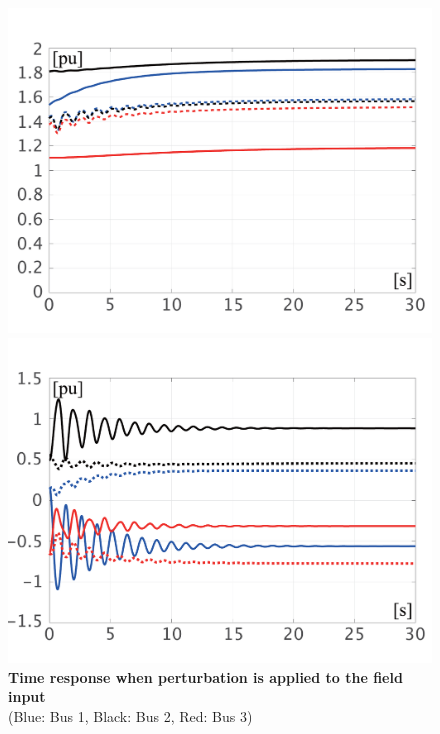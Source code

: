 \documentclass[graybox, envcountchap]{svmult}
\begin{document}
\begin{figure}[t]
{\begin{minipage}{0.49\linewidth}
    \includegraphics[width = 1.0\linewidth]{figs/EabsVV}
    \medskip
  \end{minipage}
  \begin{minipage}{0.49\linewidth}
    \centering
    \includegraphics[width = 1.0\linewidth]{figs/PQV}
    \medskip
  \end{minipage}
  }
  \medskip
  \caption{\textbf{Time response when perturbation is applied to the field input}
  \\  \centering(Blue: Bus 1, Black: Bus 2, Red: Bus 3)}
  \label{fig:KronV}
\medskip
\end{figure}
\end{document}
